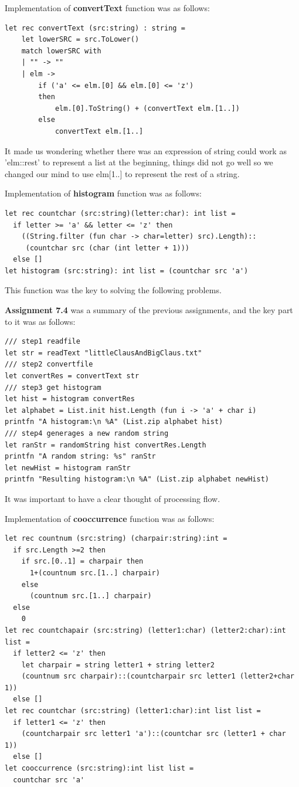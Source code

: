 \documentclass{article}
\begin{document}
Implementation of \textbf{convertText} function was as follows:

\begin{lstlisting}
let rec convertText (src:string) : string = 
    let lowerSRC = src.ToLower()
    match lowerSRC with
    | "" -> ""
    | elm -> 
        if ('a' <= elm.[0] && elm.[0] <= 'z')
        then 
            elm.[0].ToString() + (convertText elm.[1..])
        else
            convertText elm.[1..]
\end{lstlisting}

It made us wondering whether there was an expression of string could work as 'elm::rest' to represent a list at the beginning, things did not go well so we changed our mind to use elm[1..] to represent the rest of a string.

Implementation of \textbf{histogram} function was as follows:

\begin{lstlisting}
let rec countchar (src:string)(letter:char): int list = 
  if letter >= 'a' && letter <= 'z' then 
    ((String.filter (fun char -> char=letter) src).Length)::
     (countchar src (char (int letter + 1)))
  else []
let histogram (src:string): int list = (countchar src 'a')
\end{lstlisting}

This function was the key to solving the following problems.

\textbf{Assignment 7.4} was a summary of the previous assignments, and the key part to it was as follows:
\begin{lstlisting}
/// step1 readfile
let str = readText "littleClausAndBigClaus.txt"
/// step2 convertfile
let convertRes = convertText str
/// step3 get histogram
let hist = histogram convertRes
let alphabet = List.init hist.Length (fun i -> 'a' + char i)
printfn "A histogram:\n %A" (List.zip alphabet hist)
/// step4 generages a new random string
let ranStr = randomString hist convertRes.Length
printfn "A random string: %s" ranStr
let newHist = histogram ranStr
printfn "Resulting histogram:\n %A" (List.zip alphabet newHist)
\end{lstlisting}

It was important to have a clear thought of processing flow.

Implementation of \textbf{cooccurrence} function was as follows:

\begin{lstlisting}
let rec countnum (src:string) (charpair:string):int =
  if src.Length >=2 then
    if src.[0..1] = charpair then
      1+(countnum src.[1..] charpair)
    else
      (countnum src.[1..] charpair)
  else
    0
let rec countchapair (src:string) (letter1:char) (letter2:char):int list =
  if letter2 <= 'z' then
    let charpair = string letter1 + string letter2
    (countnum src charpair)::(countcharpair src letter1 (letter2+char 1))
  else []
let rec countchar (src:string) (letter1:char):int list list = 
  if letter1 <= 'z' then
    (countcharpair src letter1 'a')::(countchar src (letter1 + char 1))
  else []
let cooccurrence (src:string):int list list =
  countchar src 'a'
\end{lstlisting}
\end{document}
